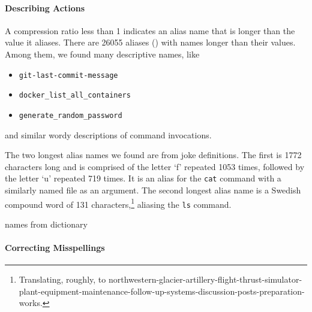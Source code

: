 \paragraph{\bf Describing Actions}

A compression ratio less than 1 indicates an alias name that is longer than the value it aliases.
There are \num{26055} aliases () with names longer than their values.
Among them, we found many descriptive names, like
\begin{itemize}
    \item \verb|git-last-commit-message|
    \item \verb|docker_list_all_containers|
    \item \verb|generate_random_password|
\end{itemize}
and similar wordy descriptions of command invocations.

The two longest alias names we found are from joke definitions.
The first is \num{1772} characters long and is comprised of the letter `f' repeated \num{1053} times, followed by the letter `u' repeated 719 times.
It is an alias for the \verb|cat| command with a similarly named file as an argument.
The second longest alias name is a Swedish compound word of \num{131} characters,\footnote{Translating, roughly, to northwestern-glacier-artillery-flight-thrust-simulator-plant-equipment-maintenance-follow-up-systems-discussion-posts-preparation-works.} aliasing the \verb|ls| command.

\TODO names from dictionary

\paragraph{\bf Correcting Misspellings}

